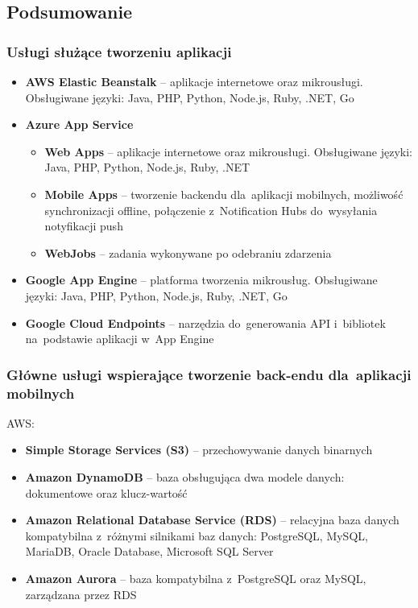 \documentclass[12pt,a4paper,twoside,titlepage,openright]{book}
\begin{document}
\subsection*{Podsumowanie}

\subsubsection{Usługi służące tworzeniu aplikacji}
\begin{itemize}
\item \textbf{AWS Elastic Beanstalk} -- aplikacje internetowe oraz mikrousługi. Obsługiwane języki: Java, PHP, Python, Node.js, Ruby, .NET, Go
\item \textbf{Azure App Service}
	\begin{itemize}
		\item \textbf{Web Apps} -- aplikacje internetowe oraz mikrousługi. Obsługiwane języki:  Java, PHP, Python, Node.js, Ruby, .NET
		\item \textbf{Mobile Apps} -- tworzenie backendu dla~aplikacji mobilnych, możliwość synchronizacji offline, połączenie z~Notification Hubs do~wysyłania notyfikacji push
		\item \textbf{WebJobs} -- zadania wykonywane po odebraniu zdarzenia
	\end{itemize}
\item \textbf{Google App Engine} -- platforma tworzenia mikrousług. Obsługiwane języki: Java, PHP, Python, Node.js, Ruby, .NET, Go
\item \textbf{Google Cloud Endpoints} -- narzędzia do~generowania API i~bibliotek na~podstawie aplikacji w~App Engine
\end{itemize}

\subsubsection{Główne usługi wspierające tworzenie back-endu dla~aplikacji mobilnych}

AWS:
\begin{itemize}
\item \textbf{Simple Storage Services (S3)} -- przechowywanie danych binarnych
\item \textbf{Amazon DynamoDB} -- baza obsługująca dwa modele danych: dokumentowe oraz klucz-wartość
\item \textbf{Amazon Relational Database Service (RDS)} -- relacyjna baza danych kompatybilna z~różnymi silnikami baz danych: PostgreSQL, MySQL, MariaDB, Oracle Database, Microsoft SQL Server
\item \textbf{Amazon Aurora} -- baza kompatybilna z~PostgreSQL oraz MySQL, zarządzana przez RDS
\end{itemize}
\end{document}
